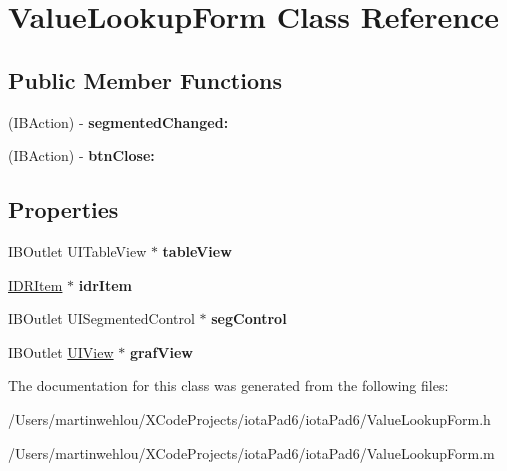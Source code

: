 \hypertarget{interface_value_lookup_form}{
\section{ValueLookupForm Class Reference}
\label{interface_value_lookup_form}
}
\subsection*{Public Member Functions}
\begin{DoxyCompactItemize}
\item 
\hypertarget{interface_value_lookup_form_a1e15a8fa2a9092179ec32459a824fd30}{
(IBAction) -\/ {\bfseries segmentedChanged:}}
\label{interface_value_lookup_form_a1e15a8fa2a9092179ec32459a824fd30}

\item 
\hypertarget{interface_value_lookup_form_a061b80a748fa82d2e410ce0f84e1ca54}{
(IBAction) -\/ {\bfseries btnClose:}}
\label{interface_value_lookup_form_a061b80a748fa82d2e410ce0f84e1ca54}

\end{DoxyCompactItemize}
\subsection*{Properties}
\begin{DoxyCompactItemize}
\item 
\hypertarget{interface_value_lookup_form_a9d0a9a450d3ac1d6833b83f8688dd4ec}{
IBOutlet UITableView $\ast$ {\bfseries tableView}}
\label{interface_value_lookup_form_a9d0a9a450d3ac1d6833b83f8688dd4ec}

\item 
\hypertarget{interface_value_lookup_form_adb93faeb9c33986999bc43891aaa571c}{
\hyperlink{interface_i_d_r_item}{IDRItem} $\ast$ {\bfseries idrItem}}
\label{interface_value_lookup_form_adb93faeb9c33986999bc43891aaa571c}

\item 
\hypertarget{interface_value_lookup_form_a43893827fc1fcff300bde9291909ff87}{
IBOutlet UISegmentedControl $\ast$ {\bfseries segControl}}
\label{interface_value_lookup_form_a43893827fc1fcff300bde9291909ff87}

\item 
\hypertarget{interface_value_lookup_form_aa71f4e6afb8369c3313bf29feb6bb273}{
IBOutlet \hyperlink{class_u_i_view}{UIView} $\ast$ {\bfseries grafView}}
\label{interface_value_lookup_form_aa71f4e6afb8369c3313bf29feb6bb273}

\end{DoxyCompactItemize}


The documentation for this class was generated from the following files:\begin{DoxyCompactItemize}
\item 
/Users/martinwehlou/XCodeProjects/iotaPad6/iotaPad6/ValueLookupForm.h\item 
/Users/martinwehlou/XCodeProjects/iotaPad6/iotaPad6/ValueLookupForm.m\end{DoxyCompactItemize}
